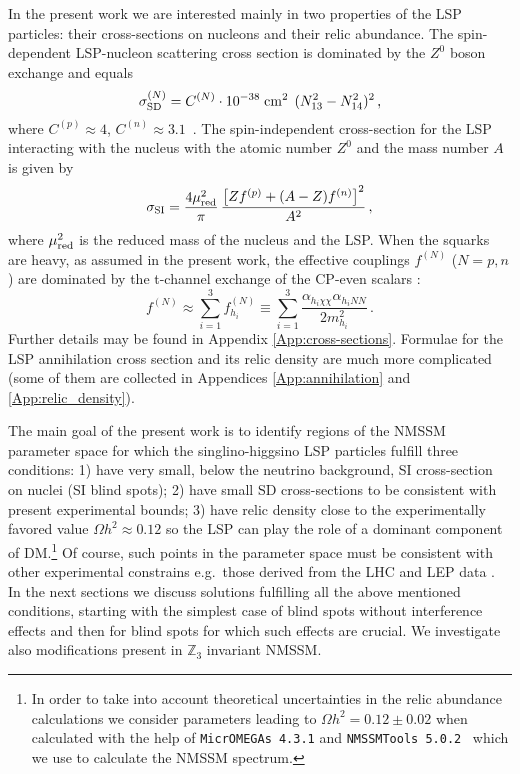 \documentclass[12pt,twoside]{article}
\begin{document}
In the present work we are interested mainly in two properties
of the LSP particles: their cross-sections on nucleons and 
their relic abundance. 
The spin-dependent LSP-nucleon scattering cross section 
is dominated by the $Z^0$ boson exchange and equals
%
\begin{equation}
\label{eq:sigSD}
\sigma_{\rm SD}^{(N)}=C^{(N)}\cdot 10^{-38}\;{\rm cm^2}\;\,(N_{13}^2-N_{14}^2)^2\,,
\end{equation}
%
where $C^{(p)}\approx 4$, $C^{(n)}\approx 3.1$~\cite{SD}.
The spin-independent cross-section for the LSP interacting 
with the nucleus with the atomic number $Z^0$ and the mass number $A$ 
is given by
%
\begin{equation}
\sigma_{\rm SI}
=
\frac{4\mu^2_{\rm red}}{\pi}\,\frac{\left[Zf^{(p)}+(A-Z)f^{(n)}\right]^2}{A^2}
\,,
\end{equation}
%
where $\mu^2_{\rm red}$ is the reduced mass of the nucleus and the LSP. 
When the squarks are heavy, as assumed in the present work, 
the effective couplings $f^{(N)}$ ($N=p,n$) 
are dominated by the t-channel exchange of the CP-even scalars
\cite{Jungman:1995df}:
%
\begin{equation}
\label{fN}
f^{(N)}
\approx
\sum_{i=1}^3
f^{(N)}_{h_i}
\equiv
\sum_{i=1}^3
\frac{\alpha_{h_i\chi\chi}\alpha_{h_iNN}}{2m_{h_i}^2}
\,.
\end{equation}
%
Further details may be found in Appendix \ref{App:cross-sections}.
Formulae for the LSP annihilation cross section and its relic density 
are much more complicated (some of them are collected in Appendices 
\ref{App:annihilation} and \ref{App:relic_density}). 


The main goal of the present work is to identify regions of the NMSSM 
parameter space for which the singlino-higgsino LSP particles fulfill 
three conditions: 
1) have very small, below the neutrino background, SI cross-section 
on nuclei  (SI blind spots);
2) have small SD cross-sections to be consistent with present 
experimental bounds; 
3) have relic density close to the experimentally favored 
value $\Omega h^2\approx0.12$ so the LSP can play the role of a dominant 
component of
DM.\footnote{In order to take into account theoretical uncertainties in the 
relic abundance calculations we consider parameters leading to 
$\Omega h^2 = 0.12 \pm 0.02$ when calculated with the help of 
{\tt MicrOMEGAs 4.3.1} \cite{micromegas} and 
{\tt NMSSMTools 5.0.2}~\cite{NTools1,NTools2} which we use to calculate the NMSSM spectrum.}
 Of course, such points in the parameter space
must be consistent with other experimental constrains 
e.g.~those derived from the LHC \cite{Higgscomb} and LEP data \cite{LEPchargino,LEPZinv}. In the next sections we 
discuss solutions fulfilling all the above mentioned 
conditions, starting with the simplest case of blind spots without 
interference effects and then for blind spots for which such 
effects are crucial. We investigate also modifications present 
in $\mathbb{Z}_3$ invariant NMSSM.
\end{document}
